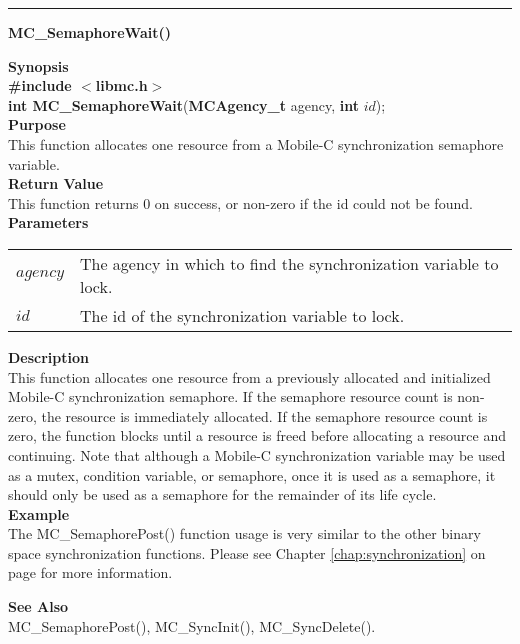 \noindent
\vspace{5pt}
\rule{6.5in}{0.015in}
\noindent
{}
{\LARGE \bf MC\_SemaphoreWait()}\\

\noindent
{\bf Synopsis}\\
{\bf \#include $<$libmc.h$>$}\\
{\bf int MC\_SemaphoreWait}({\bf MCAgency\_t} agency, {\bf int} $id$);\\

\noindent
{\bf Purpose}\\
This function allocates one resource from a Mobile-C synchronization semaphore 
variable.\\

\noindent
{\bf Return Value}\\
This function returns 0 on success, or non-zero if the id could not be found.\\

\noindent
{\bf Parameters}
\vspace{-0.1pt}
\begin{description}
\item
\begin{tabular}{p{10 mm}p{145 mm}} 
$agency$ & The agency in which to find the synchronization variable to lock.\\
$id$ & The id of the synchronization variable to lock. 
\end{tabular}
\end{description}

\noindent
{\bf Description}\\
This function allocates one resource from a previously allocated and 
initialized Mobile-C synchronization semaphore. 
If the semaphore resource count is non-zero, the resource is immediately 
allocated. 
If the semaphore resource count is zero, the function blocks until a resource 
is freed before allocating a resource and continuing. 
Note that although a Mobile-C synchronization variable may be used as a mutex, 
condition variable, or semaphore, once it is used as a semaphore, it should 
only be used as a semaphore for the remainder of its life cycle.\\

\noindent
{\bf Example}\\
The MC\_SemaphorePost() function usage is very similar to the other
binary space synchronization functions. Please see Chapter 
\ref{chap:synchronization} on page \pageref{chap:synchronization} for
more information.\\
\noindent

\noindent
{\bf See Also}\\
MC\_SemaphorePost(), MC\_SyncInit(), MC\_SyncDelete().\\

